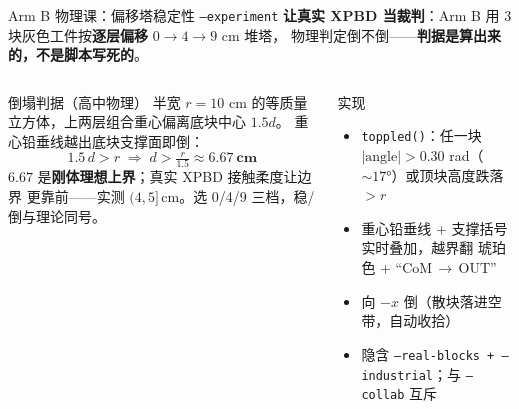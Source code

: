 \documentclass[aspectratio=169, 11pt]{beamer}
\begin{document}
\begin{frame}{Arm B 物理课：偏移塔稳定性 \texttt{--experiment}}
\textbf{让真实 XPBD 当裁判}：Arm B 用 3 块灰色工件按\textbf{逐层偏移} $0\to4\to9$ cm 堆塔，
物理判定倒不倒——\textbf{判据是算出来的，不是脚本写死的}。
\vspace{6pt}
\begin{columns}[T]
\begin{block}{倒塌判据（高中物理）}
\footnotesize
半宽 $r=10$ cm 的等质量立方体，上两层组合重心偏离底块中心 $1.5d$。
重心铅垂线越出底块支撑面即倒：
\[ 1.5\,d > r \;\Rightarrow\; d > \tfrac{r}{1.5} \approx \mathbf{6.67\ \text{cm}} \]
\scriptsize $6.67$ 是\textbf{刚体理想上界}；真实 XPBD 接触柔度让边界
更靠前——实测 $(4,5]$\,cm。选 0/4/9 三档，稳/倒与理论同号。
\end{block}

\begin{block}{实现}
\footnotesize
\begin{itemize}
\item \texttt{toppled()}：任一块 $|\text{angle}|>0.30$ rad（$\sim17°$）或顶块高度跌落 $>r$
\item 重心铅垂线 + 支撑括号实时叠加，越界翻 \textcolor{orange!80!black}{琥珀色} + ``CoM\,$\to$\,OUT''
\item 向 $-x$ 倒（散块落进空带，自动收拾）
\item 隐含 \texttt{--real-blocks + --industrial}；与 \texttt{--collab} 互斥
\end{itemize}
\end{block}
\end{columns}
\end{frame}
\end{document}
